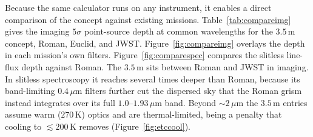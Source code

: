 \documentclass[10pt,onecolumn]{article}
\begin{document}
Because the same calculator runs on any instrument, it enables a direct comparison of the concept against existing missions. Table~\ref{tab:compareimg} gives the imaging $5\sigma$ point-source depth at common wavelengths for the $3.5$\,m concept, Roman, Euclid, and JWST. Figure~\ref{fig:compareimg} overlays the depth in each mission's own filters. Figure~\ref{fig:comparespec} compares the slitless line-flux depth against Roman. The $3.5$\,m sits between Roman and JWST in imaging. In slitless spectroscopy it reaches several times deeper than Roman, because its band-limiting $0.4\,\mu$m filters further cut the dispersed sky that the Roman grism instead integrates over its full $1.0$--$1.93\,\mu$m band. Beyond $\sim2\,\mu$m the $3.5$\,m entries assume warm ($270$\,K) optics and are thermal-limited, being a penalty that cooling to $\lesssim200$\,K removes (Figure~\ref{fig:etccool}).
\end{document}
